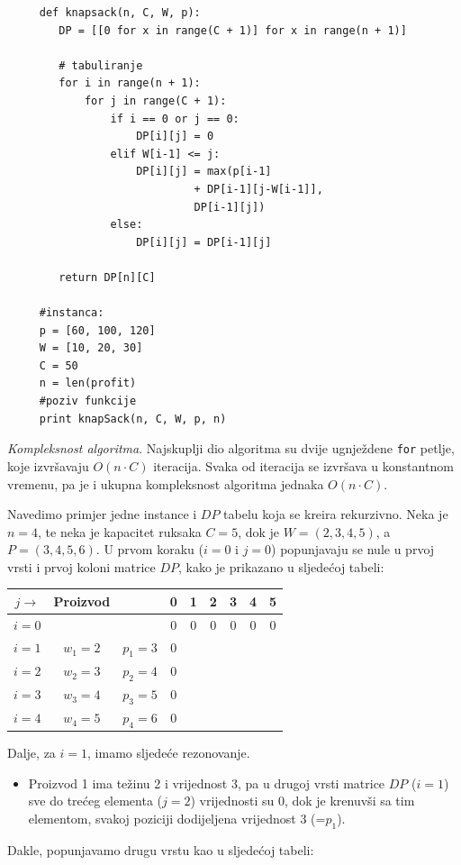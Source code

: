 \begin{solution}
	 \begin{verbatim}
	 def knapsack(n, C, W, p):
	 	DP = [[0 for x in range(C + 1)] for x in range(n + 1)]
	 
	 	# tabuliranje
	 	for i in range(n + 1):
	 		for j in range(C + 1):
	 			if i == 0 or j == 0:
	 				DP[i][j] = 0
	 			elif W[i-1] <= j:
	 				DP[i][j] = max(p[i-1]
	 				         + DP[i-1][j-W[i-1]],
	 				         DP[i-1][j])
	 			else:
	 				DP[i][j] = DP[i-1][j]
	 
	 	return DP[n][C]
	 
	 #instanca:
	 p = [60, 100, 120]
	 W = [10, 20, 30]
	 C = 50
	 n = len(profit)
	 #poziv funkcije
	 print knapSack(n, C, W, p, n)
	 \end{verbatim}
	 
 \textit{Kompleksnost algoritma}. Najskuplji dio algoritma su dvije ugnježdene \texttt{for} petlje, koje izvršavaju $O(n \cdot C)$ iteracija. Svaka od iteracija se izvršava u konstantnom vremenu, pa je i ukupna kompleksnost algoritma jednaka $O(n \cdot C)$.
\end{solution}

Navedimo primjer jedne instance i $DP$ tabelu koja se kreira rekurzivno.   Neka je $n = 4$, te neka je kapacitet ruksaka $C= 5$, dok je  $W = (2, 3, 4, 5)$, a $P = (3, 4, 5, 6)$. 
 U prvom koraku ($i=0$ i $j =0$) popunjavaju se nule u prvoj vrsti i prvoj koloni matrice $DP$, kako je prikazano u sljedećoj tabeli:
  \begin{table}[H]
 	\centering
 	\begin{tabular}{|c|cc|cccccc|}\hline
 
  	$j\rightarrow$     & Proizvod   &              &	 	0	&1&	2	&3	&4	&5 \\ \hline
        
 $i=0$ & 	& 	    & 	        0	&0	&0	&0	&0	&0  \\
 $i=1$ &	$w_1=2$	&$p_1=3$ &	0	& 	& 	& 	& 	&\\ 
 $i=2$ &	$w_2=3$	&$p_2=4$ &	0   &	& 	& 	&	&\\	 
 $i=3$ &	$w_3=4$	&$p_3=5$ &	0	& 	& 	& 	& 	&\\ 
 $i=4$ &	$w_4=5$ &$p_4=6$ &	0	& 	& 	& 	& 	&\\ \hline
 \end{tabular}
\end{table}
 
 Dalje, za $i = 1$, imamo sljedeće rezonovanje. 
 \begin{itemize}
 	\item Proizvod 1 ima težinu 2 i vrijednost 3, pa u drugoj vrsti matrice $DP$ ($i=1$) sve do trećeg elementa ($j=2$) vrijednosti su 0, dok je krenuvši sa tim elementom, svakoj poziciji dodijeljena vrijednost 3 (=$p_1$). 
 \end{itemize}
Dakle, popunjavamo drugu vrstu kao u sljedećoj tabeli:
 
